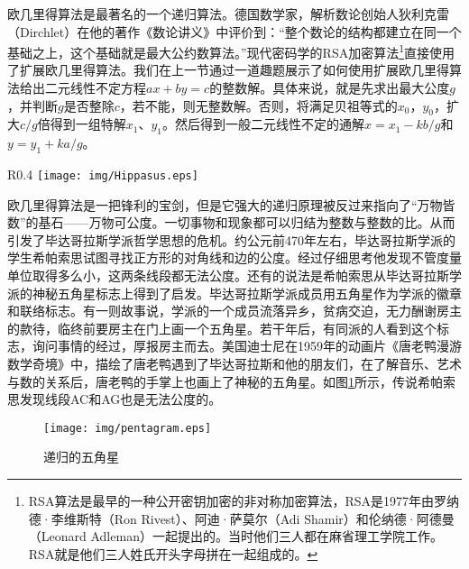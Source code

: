 \documentclass[UTF8]{article}
\begin{document}
欧几里得算法是最著名的一个递归算法。德国数学家，解析数论创始人狄利克雷（Dirchlet）在他的著作《数论讲义》中评价到：“整个数论的结构都建立在同一个基础之上，这个基础就是最大公约数算法。”现代密码学的RSA加密算法\footnote{RSA算法是最早的一种公开密钥加密的非对称加密算法，RSA是1977年由罗纳德·李维斯特（Ron Rivest）、阿迪·萨莫尔（Adi Shamir）和伦纳德·阿德曼（Leonard Adleman）一起提出的。当时他们三人都在麻省理工学院工作。RSA就是他们三人姓氏开头字母拼在一起组成的。}直接使用了扩展欧几里得算法。我们在上一节通过一道趣题展示了如何使用扩展欧几里得算法给出二元线性不定方程$ax + by = c$的整数解。具体来说，就是先求出最大公度$g$，并判断$g$是否整除$c$，若不能，则无整数解。否则，将满足贝祖等式的$x_0$，$y_0$，扩大$c/g$倍得到一组特解$x_1$、$y_1$。然后得到一般二元线性不定的通解$x = x_1 - k b / g$和$y = y_1 + k a / g$。

\begin{wrapfigure}{R}{0.4\textwidth}
 \centering
 \texttt{[image: img/Hippasus.eps]}
 \captionsetup{labelformat=empty}
 \caption{希帕索思（Hippasus of Metapontum）约公元前五世纪。}
 \label{fig:Hippasus}
\end{wrapfigure}

欧几里得算法是一把锋利的宝剑，但是它强大的递归原理被反过来指向了“万物皆数”的基石——万物可公度。一切事物和现象都可以归结为整数与整数的比。从而引发了毕达哥拉斯学派哲学思想的危机。约公元前470年左右，毕达哥拉斯学派的学生希帕索思试图寻找正方形的对角线和边的公度。经过仔细思考他发现不管度量单位取得多么小，这两条线段都无法公度。还有的说法是希帕索思从毕达哥拉斯学派的神秘五角星标志上得到了启发。毕达哥拉斯学派成员用五角星作为学派的徽章和联络标志。有一则故事说，学派的一个成员流落异乡，贫病交迫，无力酬谢房主的款待，临终前要房主在门上画一个五角星。若干年后，有同派的人看到这个标志，询问事情的经过，厚报房主而去\cite{HanXueTao16}。美国迪士尼在1959年的动画片《唐老鸭漫游数学奇境》中，描绘了唐老鸭遇到了毕达哥拉斯和他的朋友们，在了解音乐、艺术与数的关系后，唐老鸭的手掌上也画上了神秘的五角星。如图\ref{fig:pentagram}所示，传说希帕索思发现线段AC和AG也是无法公度的。


\begin{figure}[htbp]
 \centering
 \texttt{[image: img/pentagram.eps]}
 \caption{递归的五角星}
 \label{fig:pentagram}
\end{figure}
\end{document}
